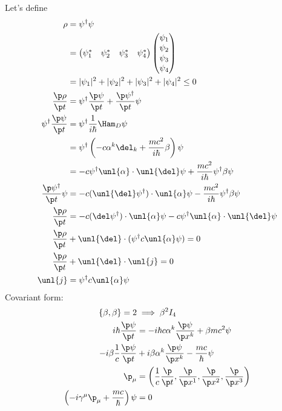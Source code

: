 \documentclass[a4paper, 11pt, normalem]{report}
\begin{document}
Let's define
\begin{align}
    \rho &= \psi^\dagger\psi \\
         &= \begin{pmatrix} \psi_1^* & \psi_2^* & \psi_3^* & \psi_4^*\end{pmatrix}\begin{pmatrix} \psi_1 \\ \psi_2 \\ \psi_3 \\ \psi_4\end{pmatrix} \\
         &= |\psi_1|^2 + |\psi_2|^2 + |\psi_3|^2 + |\psi_4|^2 \leq 0 \\
    \frac{\p\rho}{\p t} &= \psi^\dagger\frac{\p\psi}{\p t} + \frac{\p\psi^\dagger}{\p t}\psi \\
    \psi^\dagger\frac{\p\psi}{\p t} &= \psi^\dagger \frac{1}{i\hbar}\Ham_D\psi \\
                                    &= \psi^\dagger \left(-c\alpha^k\del_k + \frac{mc^2}{i\hbar}\beta\right)\psi \\
                                    &= -c\psi^\dagger\unl{\alpha}\cdot\unl{\del}\psi + \frac{mc^2}{i\hbar}\psi^\dagger \beta\psi \\
    \frac{\p\psi^\dagger}{\p t}\psi &= -c(\unl{\del}\psi^\dagger)\cdot\unl{\alpha}\psi - \frac{mc^2}{i\hbar}\psi^\dagger\beta\psi \\ 
    \frac{\p\rho}{\p t} &= -c(\del\psi^\dagger)\cdot \unl{\alpha}\psi - c\psi^\dagger\unl{\alpha} \cdot\unl{\del}\psi \\ 
    \frac{\p\rho}{\p t} &+ \unl{\del}\cdot(\psi^\dagger c\unl{\alpha}\psi) = 0 \\
    \frac{\p\rho}{\p t} &+ \unl{\del}\cdot\unl{j} = 0 \\
    \unl{j} &= \psi^\dagger c\unl{\alpha}\psi
\end{align}
Covariant form:
\begin{align}
    \{\beta,\beta\} = 2 &\implies \beta^2 I_4 \\
    i\hbar\frac{\p\psi}{\p t} &= -i\hbar c\alpha^k \frac{\p\psi}{\p x^k} + \beta mc^2\psi \\
    -i\beta\frac{1}{c}\frac{\p\psi}{\p t} &+ i\beta\alpha^k\frac{\p\psi}{\p x^k} - \frac{mc}{\hbar}\psi \\
    \p_\mu &= \left(\frac{1}{c}\frac{\p}{\p t},\frac{\p}{\p x^1},\frac{\p}{\p x^2},\frac{\p}{\p x^3}\right) \\
    \left(-i\gamma^\mu\p_\mu + \frac{mc}{\hbar}\right)\psi &= 0
\end{align}
\end{document}
